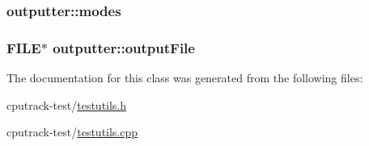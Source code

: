 \subsubsection[{\texorpdfstring{modes}{modes}}]{ outputter\+::modes\hspace{0.3cm}{\ttfamily [private]}}\hypertarget{classoutputter_af7a6f40d233bfb34919dbfb5a474f988}{}\label{classoutputter_af7a6f40d233bfb34919dbfb5a474f988}
\subsubsection[{\texorpdfstring{output\+File}{outputFile}}]{\setlength{\rightskip}{0pt plus 5cm}F\+I\+LE$\ast$ outputter\+::output\+File\hspace{0.3cm}{\ttfamily [private]}}\hypertarget{classoutputter_ae3c0ba999382f01860bdcc735d5e94b1}{}\label{classoutputter_ae3c0ba999382f01860bdcc735d5e94b1}


The documentation for this class was generated from the following files\+:\begin{DoxyCompactItemize}
\item 
cputrack-\/test/\hyperlink{testutils_8h}{testutils.\+h}\item 
cputrack-\/test/\hyperlink{testutils_8cpp}{testutils.\+cpp}\end{DoxyCompactItemize}
